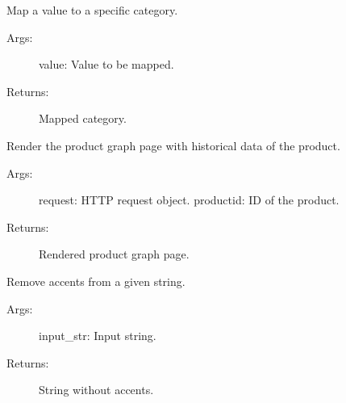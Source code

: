 \documentclass[letterpaper,10pt,english]{sphinxmanual}
\begin{document}

\begin{fulllineitems}
\label{\detokenize{modules/views:Inventory.views.MapCategory}}
\sphinxAtStartPar
Map a value to a specific category.
\begin{description}
\item[{Args:}] \leavevmode
\sphinxAtStartPar
value: Value to be mapped.

\item[{Returns:}] \leavevmode
\sphinxAtStartPar
Mapped category.

\end{description}

\end{fulllineitems}


\begin{fulllineitems}
\label{\detokenize{modules/views:Inventory.views.ProductGraph}}
\sphinxAtStartPar
Render the product graph page with historical data of the product.
\begin{description}
\item[{Args:}] \leavevmode
\sphinxAtStartPar
request: HTTP request object.
productid: ID of the product.

\item[{Returns:}] \leavevmode
\sphinxAtStartPar
Rendered product graph page.

\end{description}

\end{fulllineitems}


\begin{fulllineitems}
\label{\detokenize{modules/views:Inventory.views.RemoveAccents}}
\sphinxAtStartPar
Remove accents from a given string.
\begin{description}
\item[{Args:}] \leavevmode
\sphinxAtStartPar
input\_str: Input string.

\item[{Returns:}] \leavevmode
\sphinxAtStartPar
String without accents.

\end{description}

\end{fulllineitems}
\end{document}

